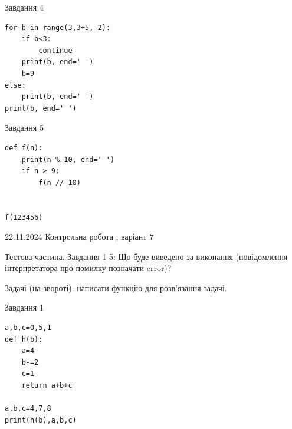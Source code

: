 \documentclass[12pt, ukrainian]{article}
\begin{document}
{{{{{{\begin{minipage}[t]{8.5cm}
\end{minipage}
\vline \hspace{6mm}
\begin{minipage}[t]{10.7cm}
               
{\begin{center}Завдання {4}\end{center}}
\vspace{-6mm}

\begin{verbatim}
for b in range(3,3+5,-2):
    if b<3:
        continue
    print(b, end=' ')
    b=9
else:
    print(b, end=' ')
print(b, end=' ')
\end{verbatim}


\vspace{5mm}
               
{\begin{center}Завдання {5}\end{center}}
\vspace{-6mm}

\begin{verbatim}
def f(n):
    print(n % 10, end=' ')
    if n > 9:
        f(n // 10)
    

f(123456)
\end{verbatim}


\end{minipage}

\newpage

{{22.11.2024 Контрольна робота , варіант  \No \textbf { 7 }\par}}
{

Тестова частина. Завдання 1-5: Що буде виведено за виконання (повідомлення інтерпретатора про помилку позначати error)?

Задачі (на звороті): написати функцію для розв'язання задачі.

\vspace{5mm} \begin{minipage}[t]{8.5cm}
               
{\begin{center}Завдання {1}\end{center}}
\vspace{-6mm}

\begin{verbatim}
a,b,c=0,5,1
def h(b):
    a=4
    b-=2
    c=1
    return a+b+c

a,b,c=4,7,8
print(h(b),a,b,c)
\end{verbatim}



\end{minipage}}}}}}}}
\end{document}
